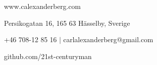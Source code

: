 \documentclass[../main.tex]{subfiles}
\begin{document}
\renewcommand{\maketitle}{
\begin{center}
{\LARGE\theauthor}

www.calexanderberg.com

Persikogatan 16, 165 63 Hässelby, Sverige

+46 708-12 85 16 $|$ carlalexanderberg@gmail.com

github.com/21st-centuryman
\end{center}
}

\maketitle
\end{document}
